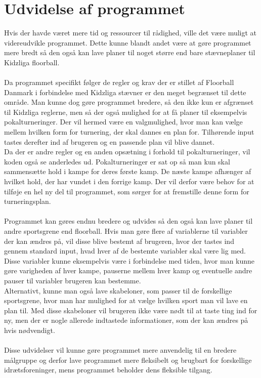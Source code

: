 \section*{Udvidelse af programmet}
Hvis der havde været mere tid og ressourcer til rådighed, ville det være muligt at videreudvikle programmet. Dette kunne blandt andet være at gøre programmet mere bredt så den også kan lave planer til noget større end bare stævneplaner til Kidzliga floorball.
\\\\
Da programmet specifikt følger de regler og krav der er stillet af Floorball Danmark i forbindelse med Kidzliga stævner er den meget begrænset til dette område. Man kunne dog gøre programmet bredere, så den ikke kun er afgrænset til Kidzliga reglerne, men så der også mulighed for at få planer til eksempelvis pokalturneringer. Der vil hermed være en valgmulighed, hvor man kan vælge mellem hvilken form for turnering, der skal dannes en plan for. Tilhørende input tastes derefter ind af brugeren og en passende plan vil blive dannet.
\\
Da der er andre regler og en anden opsætning i forhold til pokalturneringer, vil koden også se anderledes ud. Pokalturneringer er sat op så man kun skal sammensætte hold i kampe for deres første kamp. De næste kampe afhænger af hvilket hold, der har vundet i den forrige kamp. Der vil derfor være behov for at tilføje en hel ny del til programmet, som sørger for at fremstille denne form for turneringsplan. 
\\\\
Programmet kan gøres endnu bredere og udvides så den også kan lave planer til andre sportsgrene end floorball. Hvis man gøre flere af variablerne til variabler der kan ændres på, vil disse blive bestemt af brugeren, hvor der tastes ind gennem standard input, hvad hver af de bestemte variabler skal være lig med. Disse variabler kunne eksempelvis være i forbindelse med tiden, hvor man kunne gøre varigheden af hver kampe, pauserne mellem hver kamp og eventuelle andre pauser til variabler brugeren kan bestemme.
\\
Alternativt, kunne man også lave skabeloner, som passer til de forskellige sportsgrene, hvor man har mulighed for at vælge hvilken sport man vil lave en plan til. Med disse skabeloner vil brugeren ikke være nødt til at taste ting ind for ny, men der er nogle allerede indtastede informationer, som der kan ændres på hvis nødvendigt. 
\\\\
Disse udvidelser vil kunne gøre programmet mere anvendelig til en bredere målgruppe og derfor lave programmet mere fleksibelt og brugbart for forskellige idrætsforeninger, mens programmet beholder dens fleksible tilgang.

